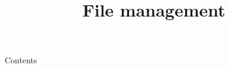 
\newcommand{\topic}{
	File management
}

\title{\topic}
\supertitle{\course}
\date{}



\maketitle

\begin{frame}{Contents}
	\tableofcontents
\end{frame}



